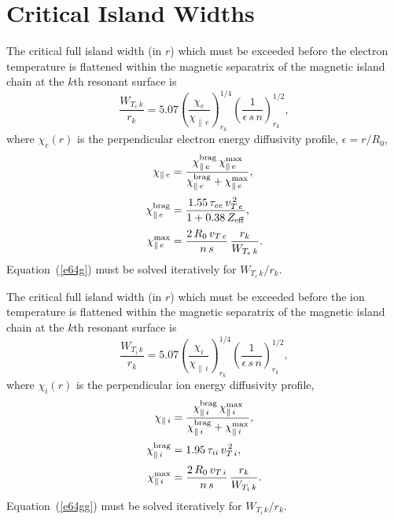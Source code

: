 \documentclass[notitlepage,12pt]{article}
\begin{document}
\section{Critical Island Widths}
The critical full island width (in $r$) which must be exceeded before the electron temperature is flattened within the
magnetic separatrix of the magnetic island chain at the $k$th resonant surface is
\begin{equation}\label{e64g}
\frac{W_{T_e\,k} }{r_k}= 5.07\left(\frac{\chi_e}{\chi_{\parallel\,e}}\right)^{1/4}_{r_k}\left(\frac{1}{\epsilon\,s\,n}\right)^{1/2}_{r_k},
\end{equation}
where $\chi_e(r)$ is the perpendicular electron energy diffusivity profile, $\epsilon =r/R_0$, 
\begin{align}
\chi_{\parallel\,e}&= \frac{\chi_{\parallel\,e}^{\rm brag}\,\chi_{\parallel\,e}^{\rm max}}{\chi_{\parallel\,e}^{\rm brag}+\chi_{\parallel\,e}^{\rm max}},\\[0.5ex]
\chi_{\parallel\,e}^{\rm brag} &= \frac{1.55\,\tau_{ee}\,v_{T\,e}^{\,2}}{1+0.38\,Z_{\rm eff}},\\[0.5ex]
\chi_{\parallel\,e}^{\rm max} &= \frac{2\,R_0\,v_{T\,e}}{n\,s}\,\frac{r_k}{W_{T_e\,k}}.
\end{align}
Equation~(\ref{e64g}) must be solved iteratively for $W_{T_e\,k}/r_k$. 

The critical full island width (in $r$) which must be exceeded before the ion temperature is flattened within the
magnetic separatrix of the magnetic island chain at the $k$th resonant surface is
\begin{equation}\label{e64gg}
\frac{W_{T_i\,k} }{r_k}= 5.07\left(\frac{\chi_i}{\chi_{\parallel\,i}}\right)^{1/4}_{r_k}\left(\frac{1}{\epsilon\,s\,n}\right)^{1/2}_{r_k},
\end{equation}
where $\chi_i(r)$ is the perpendicular ion energy diffusivity profile, 
\begin{align}
\chi_{\parallel\,i}&= \frac{\chi_{\parallel\,i}^{\rm brag}\,\chi_{\parallel\,i}^{\rm max}}{\chi_{\parallel\,i}^{\rm brag}+\chi_{\parallel\,i}^{\rm max}},\\[0.5ex]
\chi_{\parallel\,i}^{\rm brag} &= 1.95\,\tau_{ii}\,v_{T\,i}^{\,2},\\[0.5ex]
\chi_{\parallel\,i}^{\rm max} &= \frac{2\,R_0\,v_{T\,i}}{n\,s}\,\frac{r_k}{W_{T_i\,k}}.
\end{align}
Equation~(\ref{e64gg}) must be solved iteratively for $W_{T_i\,k}/r_k$.
\end{document}
